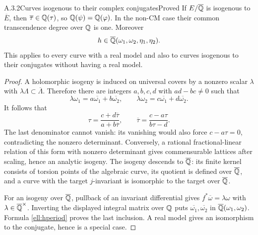 \begin{result}{A.3.2}{Curves isogenous to their complex conjugates}{Proved}
If $E/\overline{\mathbb Q}$ is isogenous to $\overline E$, then $\overline\tau\in\mathbb Q(\tau)$, so $\mathbb Q(\psi)=\mathbb Q(\varphi)$. In the non-CM case their common transcendence degree over $\mathbb Q$ is one. Moreover
\[
 h\in\overline{\mathbb Q}(\omega_1,\omega_2,\eta_1,\eta_2).
\]
This applies to every curve with a real model and also to curves isogenous to their conjugates without having a real model.
\end{result}
\begin{proof}
A holomorphic isogeny is induced on universal covers by a nonzero scalar $\lambda$ with $\lambda\Lambda\subset\overline\Lambda$. Therefore there are integers $a,b,c,d$ with $ad-bc\ne0$ such that
\[
 \lambda\omega_1=a\overline{\omega_1}+b\overline{\omega_2},
 \qquad \lambda\omega_2=c\overline{\omega_1}+d\overline{\omega_2}.
\]
It follows that
\[
 \tau=\frac{c+d\overline\tau}{a+b\overline\tau},
 \qquad \overline\tau=\frac{c-a\tau}{b\tau-d}.
\]
The last denominator cannot vanish: its vanishing would also force $c-a\tau=0$, contradicting the nonzero determinant. Conversely, a rational fractional-linear relation of this form with nonzero determinant gives commensurable lattices after scaling, hence an analytic isogeny. The isogeny descends to $\overline{\mathbb Q}$: its finite kernel consists of torsion points of the algebraic curve, its quotient is defined over $\overline{\mathbb Q}$, and a curve with the target $j$-invariant is isomorphic to the target over $\overline{\mathbb Q}$.

For an isogeny over $\overline{\mathbb Q}$, pullback of an invariant differential gives $f^*\overline\omega=\lambda\omega$ with $\lambda\in\overline{\mathbb Q}^\times$. Inverting the displayed integral matrix over $\mathbb Q$ puts $\overline{\omega_1},\overline{\omega_2}$ in $\overline{\mathbb Q}(\omega_1,\omega_2)$. Formula \eqref{ell:hperiod} proves the last inclusion. A real model gives an isomorphism to the conjugate, hence is a special case.
\end{proof}


